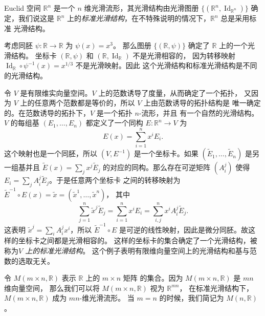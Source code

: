 \documentclass[fontset=none]{Notes}
\DeclareMathOperator\Id{Id}
\begin{document}
\begin{example}[Euclid 空间]
  Euclid 空间 $\mathbb{R}^n$ 是一个 $n$ 维光滑流形，其光滑结构由光滑图册
  $\{(\mathbb{R}^n,\Id_{\mathbb{R}^n})\}$ 确定，我们说这是 $\mathbb{R}^n$
  上的\emph{标准光滑结构}，在不特殊说明的情况下，$\mathbb{R}^n$ 总是采用标准
  光滑结构。
\end{example}

\begin{example}
  考虑同胚 $\psi:\mathbb{R}\to\mathbb{R}$ 为 $\psi(x)=x^{3}$。
  那么图册 $\{(\mathbb{R},\psi)\}$ 确定了 $\mathbb{R}$ 上的一个光滑结构。
  坐标卡 $(\mathbb{R},\psi)$ 和 $(\mathbb{R},\Id_{\mathbb{R}})$ 不是光滑相容的，
  因为转移映射 $\Id_{\mathbb{R}}\circ\psi^{-1}(x)=x^{1/3}$ 不是光滑映射。因此
  这个光滑结构和标准光滑结构是不同的光滑结构。
\end{example}

\begin{example}[有限维向量空间]\label{exa:finite-dim vector space as manifold}
  令 $V$ 是有限维实向量空间。$V$ 上的范数诱导了度量，从而确定了一个拓扑，
  又因为 $V$ 上的任意两个范数都是等价的，所以 $V$ 上由范数诱导的拓扑结构是
  唯一确定的。在范数诱导的拓扑下，$V$ 是一个拓扑 $n$-流形，并且
  有一个自然的光滑结构。$V$ 的每组基 $(E_1,\dots,E_n)$ 都定义了一个同构
  $E:\mathbb{R}^n\to V$ 为
  \[
    E(x)=\sum_{i=1}^n x^iE_i.  
  \]
  这个映射也是一个同胚，所以 $(V,E^{-1})$ 是一个坐标卡。如果
  $(\tilde{E}_1,\dots,\tilde{E}_n)$ 是另一组基并且
  $\tilde{E}(x)=\sum_j x^j\tilde{E}_j$ 的对应的同构。那么存在可逆矩阵
  $(A_i^j)$ 使得 $E_i=\sum_j A_i^j\tilde{E}_j$。于是任意两个坐标卡
  之间的转移映射为 $\tilde{E}^{-1}\circ E(x)=\tilde{x}=\left(\tilde{x}^1,\dots,\tilde{x}^n\right)$，
  其中
  \[
    \sum_{j=1}^n\tilde{x}^j\tilde{E}_j=\sum_{i=1}^nx^iE_i=\sum_{i,j}^nx^iA_{i}^j\tilde{E}_j.  
  \]
  这表明 $\tilde{x}^j=\sum_iA_i^jx^i$，所以 $\tilde{E}^{-1}\circ E$
  是可逆的线性映射，因此是微分同胚。故这样的坐标卡之间都是光滑相容的。
  这样的坐标卡的集合确定了一个光滑结构，被称为\emph{$V$ 上的标准光滑结构}。
  这个例子表明有限维向量空间上的光滑结构和基与范数的选取无关。
\end{example}

\begin{example}[矩阵空间]
  令 $M(m\times n,\mathbb{R})$ 表示 $\mathbb{R}$ 上的 $m\times n$ 矩阵
  的集合。因为 $M(m\times n,\mathbb{R})$ 是 $mn$ 维向量空间，
  那么我们可以将 $M(m\times n,\mathbb{R})$ 视为 $\mathbb{R}^{mn}$，
  在标准光滑结构下，$M(m\times n,\mathbb{R})$ 成为 $mn$-维光滑流形。
  当 $m=n$ 的时候，我们简记为 $M(n,\mathbb{R})$。
\end{example}
\end{document}

